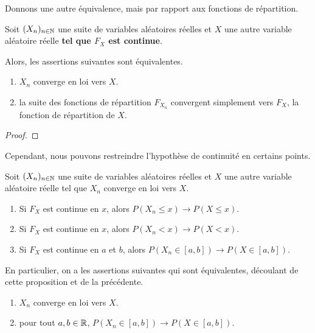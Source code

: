 Donnons une autre équivalence, mais par rapport aux fonctions de répartition.

\begin{theorem}
	Soit $(X_{n})_{n \in \mathbb{N}}$ une suite de variables aléatoires réelles et
	$X$ une autre variable aléatoire réelle \textbf{tel que $F_{X}$ est
continue}.

	Alors, les assertions suivantes sont équivalentes.

	\begin{enumerate}
		\item $X_{n}$ converge en loi vers $X$.
		\item la suite des fonctions de répartition $F_{X_{n}}$ convergent simplement
			vers $F_{X}$, la fonction de répartition de $X$.
	\end{enumerate}
\end{theorem}

\ifdefined\outputproof
\begin{proof}

\end{proof}
\fi

Cependant, nous pouvons restreindre l'hypothèse de continuité en certains
points.

\begin{proposition}
	Soit $(X_{n})_{n \in \mathbb{N}}$ une suite de variables aléatoires réelles et
	$X$ une autre variable aléatoire réelle tel que $X_{n}$ converge en loi vers
	$X$.

	\begin{enumerate}
		\item Si $F_{X}$ est continue en $x$, alors $P(X_{n} \leq x) \rightarrow
			P(X \leq x)$.
		\item Si $F_{X}$ est continue en $x$, alors $P(X_{n} < x) \rightarrow
			P(X < x)$.
		\item Si $F_{X}$ est continue en $a$ et $b$, alors $P(X_{n} \in [a, b])
			\rightarrow P(X \in [a, b])$.
	\end{enumerate}

	En particulier, on a les assertions suivantes qui sont équivalentes,
	découlant de cette
	proposition et de la précédente.

	\begin{enumerate}
		\item $X_{n}$ converge en loi vers $X$.
		\item pour tout $a, b \in \mathbb{R}$, $P(X_{n} \in [a, b]) \rightarrow P(X \in [a,
			b])$.
	\end{enumerate}
\end{proposition}

